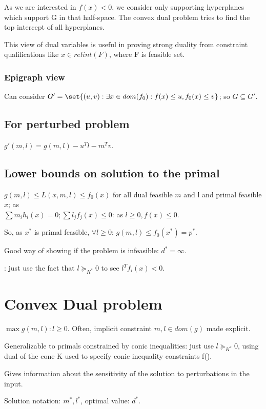 \documentclass[oneside, article]{memoir}
\begin{document}
As we are interested in $f(x) < 0$, we consider only supporting hyperplanes which support G in that half-space. The convex dual problem tries to find the top intercept of all hyperplanes.

This view of dual variables is useful in proving strong duality from constraint qualifications like $x \in relint(F)$, where F is feasible set.

\subsubsection{Epigraph view}
Can consider $G' = \set{(u, v): \exists x \in dom(f_0): f(x) \leq u, f_0(x) \leq v}$; so $G \subseteq G'$.

\subsection{For perturbed problem}
$g'(m, l) = g(m, l) - u^{T}l - m^{T}v$.

\subsection{Lower bounds on solution to the primal}
$g(m, l) \leq L(x, m, l) \leq f_0(x)$ for all dual feasible $m$ and l and primal feasible $x$; as \\
$\sum m_{i}h_{i}(x) = 0; \sum l_{j}f_{j}(x) \leq 0$: as $l \geq 0, f(x) \leq 0$.

So, as $x^*$ is primal feasible, $\forall l \geq 0$: $g(m, l) \leq f_0(x^{*}) = p^{*}$.

Good way of showing if the problem is infeasible: $d^{*} = \infty$.

: just use the fact that $l \succeq_{K^{*}}0$ to see $l^{T}f_i(x) < 0$.

\section{Convex Dual problem}
$\max g(m, l) : l \geq 0$. Often, implicit constraint $m, l \in dom(g)$ made explicit.

Generalizable to primals constrained by conic inequalities: just use $l \succeq_{K^{*}} 0$, using dual of the cone K used to specify conic inequality constraints f().

Gives information about the sensitivity of the solution to perturbations in the input.

Solution notation: $m^{*}, l^{*}$, optimal value: $d^{*}$.
\end{document}
